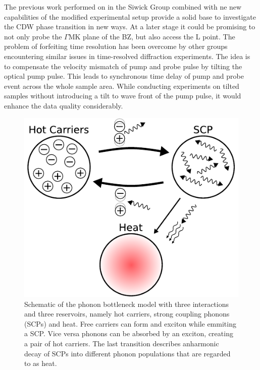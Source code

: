 The previous work performed on \ts\space in the Siwick Group combined with ne new capabilities of the modified experimental setup provide a solid base to investigate the \ac{CDW} phase transition in new ways.
At a later stage it could be promising to not only probe the $\Gamma\mathrm{MK}$ plane of the \ac{BZ}, but also access the L point.
The problem of forfeiting time resolution has been overcome by other groups encountering similar issues in time-resolved diffraction experiments.
The idea is to compensate the velocity mismatch of pump and probe pulse by tilting the optical pump pulse.
This leads to synchronous time delay of pump and probe event across the whole sample area\cite{baum2006,zhou2013}.
While conducting experiments on tilted samples without introducing a tilt to wave front of the pump pulse, it would enhance the data quality considerably.

\begin{figure}[!t]
	\begin{minipage}{0.5\columnwidth}
		\includegraphics[width=\columnwidth]{figs/phonon_bottleneck.pdf}
	\end{minipage}
	\hspace{0.04\columnwidth}
	\begin{minipage}{0.45\columnwidth}
		\caption{Schematic of the phonon bottleneck model with three interactions and three reservoirs, namely hot carriers, strong coupling phonons (SCPs) and heat. Free carriers can form and exciton while emmiting a SCP. Vice versa phonons can be absorbed by an exciton, creating a pair of hot carriers. The last transition describes anharmonic decay of SCPs into different phonon populations that are regarded to as heat.}
		\label{fig:model}
	\end{minipage}
\end{figure}

